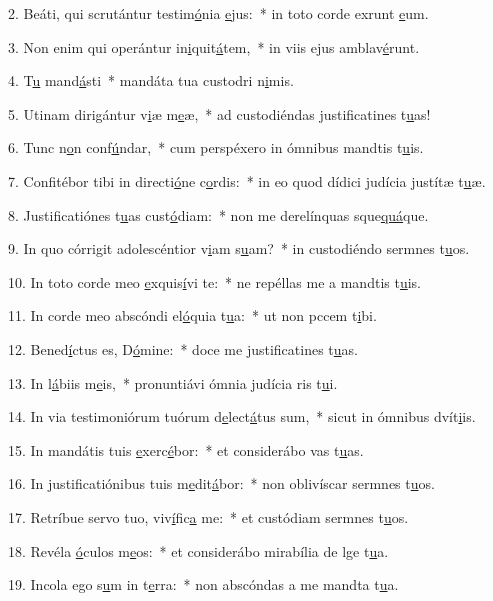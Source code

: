 2. Beáti, qui scrutántur testim\uline{ó}nia \uline{e}jus:~* in toto corde exrunt \uline{e}um.\par 
3. Non enim qui operántur in\uline{i}quit\uline{á}tem,~* in viis ejus amblav\uline{é}runt.\par 
4. T\uline{u} mand\uline{á}sti~* mandáta tua custodri n\uline{i}mis.\par 
5. Utinam dirigántur v\uline{i}æ m\uline{e}æ,~* ad custodiéndas justificatines t\uline{u}as!\par 
6. Tunc n\uline{o}n conf\uline{ú}ndar,~* cum perspéxero in ómnibus mandtis t\uline{u}is.\par 
7. Confitébor tibi in directi\uline{ó}ne c\uline{o}rdis:~* in eo quod dídici judícia justítæ t\uline{u}æ.\par 
8. Justificatiónes t\uline{u}as cust\uline{ó}diam:~* non me derelínquas sque\uline{quá}que.\par 
9. In quo córrigit adolescéntior v\uline{i}am s\uline{u}am?~* in custodiéndo sermnes t\uline{u}os.\par 
10. In toto corde meo \uline{e}xquis\uline{í}vi te:~* ne repéllas me a mandtis t\uline{u}is.\par 
11. In corde meo abscóndi el\uline{ó}quia t\uline{u}a:~* ut non pccem t\uline{i}bi.\par 
12. Bened\uline{í}ctus es, D\uline{ó}mine:~* doce me justificatines t\uline{u}as.\par 
13. In l\uline{á}biis m\uline{e}is,~* pronuntiávi ómnia judícia ris t\uline{u}i.\par 
14. In via testimoniórum tuórum d\uline{e}lect\uline{á}tus sum,~* sicut in ómnibus dvít\uline{i}is.\par 
15. In mandátis tuis \uline{e}xerc\uline{é}bor:~* et considerábo vas t\uline{u}as.\par 
16. In justificatiónibus tuis m\uline{e}dit\uline{á}bor:~* non oblivíscar sermnes t\uline{u}os.\par 
17. Retríbue servo tuo, viv\uline{í}fic\uline{a} me:~* et custódiam sermnes t\uline{u}os.\par 
18. Revéla \uline{ó}culos m\uline{e}os:~* et considerábo mirabília de lge t\uline{u}a.\par 
19. Incola ego s\uline{u}m in t\uline{e}rra:~* non abscóndas a me mandta t\uline{u}a.\par 
